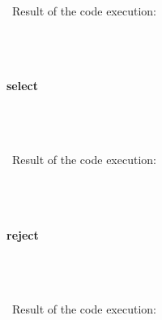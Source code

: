 \documentclass{article}
\begin{document}
\paragraph{}\
Result of the code execution:

\begin{verbatim} 

\end{verbatim}

\paragraph{}\





\paragraph{ select}\

\begin{verbatim}

\end{verbatim}


\paragraph{}\
Result of the code execution:

\begin{verbatim} 

\end{verbatim}

\paragraph{}\





\paragraph{ reject}\

\begin{verbatim}

\end{verbatim}


\paragraph{}\
Result of the code execution:
\end{document}
